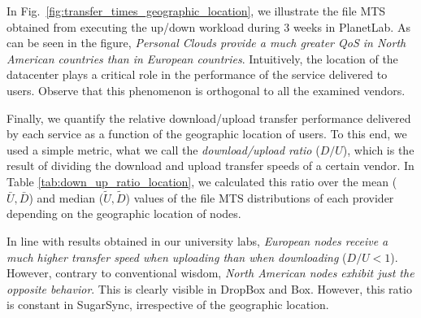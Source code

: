 In Fig.~\ref{fig:transfer_times_geographic_location},
we illustrate the file MTS obtained from executing the up/down 
workload during $3$ weeks in PlanetLab. 
As can be seen in the figure, \textit{Personal Clouds provide a
much greater QoS in North American countries than in European countries}.
Intuitively, the location of the datacenter plays
a critical role in the performance of the service delivered to users. 
Observe that this phenomenon is orthogonal to all the examined vendors.

Finally, we quantify the relative download/upload transfer performance delivered by 
each service as a function of the geographic location of users.
To this end,
we used a simple metric, what we call the \textit{download/upload ratio} ($D/U$), which
is the result of dividing the download and upload transfer speeds of a certain vendor.   
In Table \ref{tab:down_up_ratio_location}, we calculated this ratio over the mean ($\bar{U},\bar{D}$) 
and median ($\tilde{U},\tilde{D}$) values of the file MTS distributions of each
provider depending on the geographic location of nodes. 

In line with results obtained in our university labs, 
\textit{European nodes receive a much higher 
transfer speed when uploading than when downloading} ($D/U<1$). 
However, contrary to conventional wisdom, \textit{North American nodes exhibit 
just the opposite behavior}. This is clearly visible in DropBox and Box. However, this ratio is constant
in SugarSync, irrespective of the geographic location.



